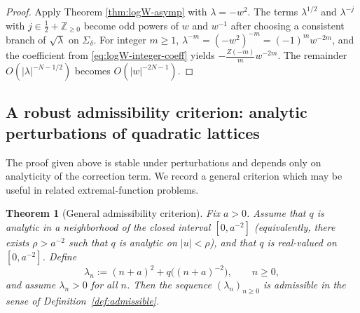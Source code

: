 \documentclass[11pt,letterpaper]{amsart}
\numberwithin{equation}{section}
\newtheorem{theorem}{Theorem}[section]
\theoremstyle{definition}
\newcommand{\Z}{\mathbb{Z}}
\begin{document}
\begin{proof}
Apply Theorem \ref{thm:logW-asymp} with $\lambda=-w^2$.
The terms $\lambda^{1/2}$ and $\lambda^{-j}$ with $j\in \tfrac12+\Z_{\ge 0}$ become
odd powers of $w$ and $w^{-1}$ after choosing a consistent branch of $\sqrt{\lambda}$ on $\Sigma_\delta$.
For integer $m\ge 1$, $\lambda^{-m}=(-w^2)^{-m}=(-1)^m w^{-2m}$, and the coefficient from
\eqref{eq:logW-integer-coeff} yields $-\frac{Z(-m)}{m}w^{-2m}$.
The remainder $O(|\lambda|^{-N-1/2})$ becomes $O(|w|^{-2N-1})$.
\end{proof}

\subsection{A robust admissibility criterion: analytic perturbations of quadratic lattices}

The proof given above is stable under perturbations and depends only on analyticity of the correction term.
We record a general criterion which may be useful in related extremal-function problems.

\begin{theorem}[General admissibility criterion]\label{thm:general-criterion}
Fix $a>0$. Assume that $q$ is analytic in a neighborhood of the closed interval $[0,a^{-2}]$
(equivalently, there exists $\rho>a^{-2}$ such that $q$ is analytic on $|u|<\rho$), and that
$q$ is real-valued on $[0,a^{-2}]$. Define
\[
\lambda_n:=(n+a)^2+q\bigl((n+a)^{-2}\bigr),\qquad n\ge 0,
\]
and assume $\lambda_n>0$ for all $n$. Then the sequence $(\lambda_n)_{n\ge 0}$ is admissible in the
sense of Definition~\ref{def:admissible}.
\end{theorem}
\end{document}
